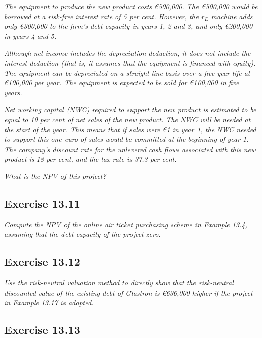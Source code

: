 \documentclass[]{book}
\newcommand{\euro}{€}
\theoremstyle{definition}
\theoremstyle{definition}
\theoremstyle{remark}
\begin{document}
\emph{The equipment to produce the new product costs \euro{}500,000. The
\euro{}500,000 would be borrowed at a risk-free interest rate of 5 per
cent. However, the \(\bar{r}_E\) machine adds only \euro{}300,000 to the
firm's debt capacity in years 1, 2 and 3, and only \euro{}200,000 in
years 4 and 5.} \citep[p.460]{book}

\emph{Although net income includes the depreciation deduction, it does
not include the interest deduction (that is, it assumes that the
equipment is financed with equity). The equipment can be depreciated on
a straight-line basis over a five-year life at \euro{}100,000 per year.
The equipment is expected to be sold for \euro{}100,000 in five years.}
\citep[p.460]{book}

\emph{Net working capital (NWC) required to support the new product is
estimated to be equal to 10 per cent of net sales of the new product.
The NWC will be needed at the start of the year. This means that if
sales were \euro{}1 in year 1, the NWC needed to support this one euro
of sales would be committed at the beginning of year 1. The company's
discount rate for the unlevered cash flows associated with this new
product is 18 per cent, and the tax rate is 37.3 per cent.}
\citep[p.460]{book}

\emph{What is the NPV of this project?} \citep[p.460]{book}

\subsection{Exercise 13.11}\label{exercise-13.11}

\emph{Compute the NPV of the online air ticket purchasing scheme in
Example 13.4, assuming that the debt capacity of the project zero.}
\citep[p.460]{book}

\subsection{Exercise 13.12}\label{exercise-13.12}

\emph{Use the risk-neutral valuation method to directly show that the
risk-neutral discounted value of the existing debt of Glastron is
\euro{}636,000 higher if the project in Example 13.17 is adopted.}
\citep[p.460]{book}

\subsection{Exercise 13.13}\label{exercise-13.13}
\end{document}
